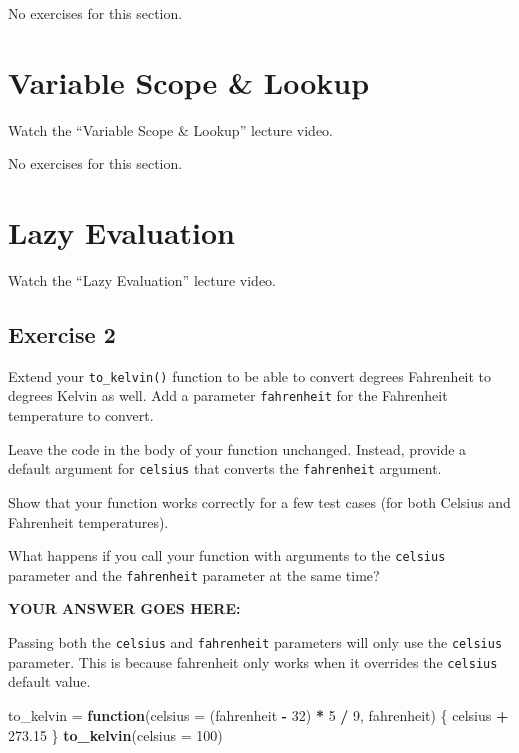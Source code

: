 \documentclass[
]{article}
\newenvironment{Shaded}{\begin{snugshade}}{\end{snugshade}}
\newcommand{\ControlFlowTok}[1]{\textcolor[rgb]{0.13,0.29,0.53}{\textbf{#1}}}
\newcommand{\DataTypeTok}[1]{\textcolor[rgb]{0.13,0.29,0.53}{#1}}
\newcommand{\DecValTok}[1]{\textcolor[rgb]{0.00,0.00,0.81}{#1}}
\newcommand{\FloatTok}[1]{\textcolor[rgb]{0.00,0.00,0.81}{#1}}
\newcommand{\KeywordTok}[1]{\textcolor[rgb]{0.13,0.29,0.53}{\textbf{#1}}}
\newcommand{\NormalTok}[1]{#1}
\newcommand{\OperatorTok}[1]{\textcolor[rgb]{0.81,0.36,0.00}{\textbf{#1}}}
\newcommand{\StringTok}[1]{\textcolor[rgb]{0.31,0.60,0.02}{#1}}
\begin{document}
No exercises for this section.

\hypertarget{variable-scope-lookup}{%
\section{Variable Scope \& Lookup}\label{variable-scope-lookup}}

Watch the ``Variable Scope \& Lookup'' lecture video.

No exercises for this section.

\hypertarget{lazy-evaluation}{%
\section{Lazy Evaluation}\label{lazy-evaluation}}

Watch the ``Lazy Evaluation'' lecture video.

\hypertarget{exercise-2}{%
\subsection{Exercise 2}\label{exercise-2}}

Extend your \texttt{to\_kelvin()} function to be able to convert degrees
Fahrenheit to degrees Kelvin as well. Add a parameter
\texttt{fahrenheit} for the Fahrenheit temperature to convert.

Leave the code in the body of your function unchanged. Instead, provide
a default argument for \texttt{celsius} that converts the
\texttt{fahrenheit} argument.

Show that your function works correctly for a few test cases (for both
Celsius and Fahrenheit temperatures).

What happens if you call your function with arguments to the
\texttt{celsius} parameter and the \texttt{fahrenheit} parameter at the
same time?

\textbf{YOUR ANSWER GOES HERE:}

Passing both the \texttt{celsius} and \texttt{fahrenheit} parameters
will only use the \texttt{celsius} parameter. This is because fahrenheit
only works when it overrides the \texttt{celsius} default value.

\begin{Shaded}
\begin{Highlighting}[]
\NormalTok{to\_kelvin =}\StringTok{ }\ControlFlowTok{function}\NormalTok{(}\DataTypeTok{celsius =}\NormalTok{ (fahrenheit }\OperatorTok{{-}}\StringTok{ }\DecValTok{32}\NormalTok{) }\OperatorTok{*}\StringTok{ }\DecValTok{5} \OperatorTok{/}\StringTok{ }\DecValTok{9}\NormalTok{, fahrenheit) \{}
\NormalTok{    celsius }\OperatorTok{+}\StringTok{ }\FloatTok{273.15}
\NormalTok{\}}
\KeywordTok{to\_kelvin}\NormalTok{(}\DataTypeTok{celsius =} \DecValTok{100}\NormalTok{)}
\end{Highlighting}
\end{Shaded}
\end{document}
